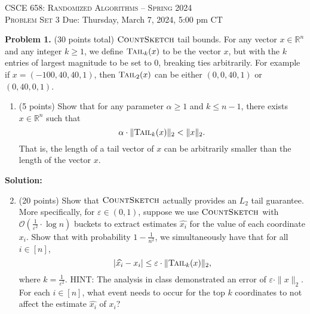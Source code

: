 \documentclass[11pt]{article}
\newcommand{\eps}{\varepsilon}
\newcommand{\tail}{\textsc{Tail}}
\newcommand{\CountSketch}{\textsc{CountSketch}}
\begin{document}
\begin{center}
{\Large\textsc{CSCE 658: Randomized Algorithms -- Spring 2024 \\ 
Problem Set 3}}
\vskip 0.1in
Due: Thursday, March 7, 2024, 5:00 pm CT
\end{center}


\noindent
\textbf{Problem 1.} (30 points total)
$\CountSketch$ tail bounds. 
\vskip 0.1in\noindent
For any vector $x\in\mathbb{R}^n$ and any integer $k\ge 1$, we define $\tail_k(x)$ to be the vector $x$, but with the $k$ entries of largest magnitude to be set to $0$, breaking ties arbitrarily. 
For example if $x=(-100, 40, 40, 1)$, then $\tail_2(x)$ can be either $(0, 0, 40, 1)$ or $(0, 40, 0, 1)$.
\begin{enumerate}
\item (5 points)
Show that for any parameter $\alpha\ge 1$ and $k\le n-1$, there exists $x\in\mathbb{R}^n$ such that
\[\alpha\cdot\|\tail_k(x)\|_2<\|x\|_2.\]
That is, the length of a tail vector of $x$ can be arbitrarily smaller than the length of the vector $x$.
\end{enumerate}

\noindent\textbf{Solution:}








\begin{enumerate}
\setcounter{enumi}{1}
\item (20 points)
Show that $\CountSketch$ actually provides an $L_2$ tail guarantee. 
More specifically, for $\eps\in(0,1)$, suppose we use $\CountSketch$ with $\mathcal{O}\left(\frac{1}{\eps^2}\cdot\log n\right)$ buckets to extract estimates $\widehat{x_i}$ for the value of each coordinate $x_i$. 
Show that with probability $1-\frac{1}{n^2}$, we simultaneously have that for all $i\in[n]$,
\[|\widehat{x_i}-x_i|\le\eps\cdot\|\tail_k(x)\|_2,\]
where $k=\frac{1}{\eps^2}$. 
\vskip 0.1in\noindent
HINT: The analysis in class demonstrated an error of $\eps\cdot\|x\|_2$. For each $i\in[n]$, what event needs to occur for the top $k$ coordinates to not affect the estimate $\widehat{x_i}$ of $x_i$?
\end{enumerate}
\end{document}
